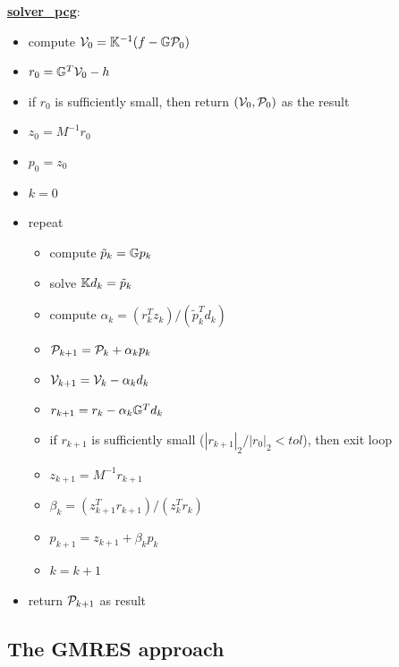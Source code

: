 \begin{mdframed}[backgroundcolor=blue!5]
\underline{\bf solver\_pcg}:
\begin{itemize}
\item compute ${\cal V}_0={\mathbb{K}}^{-1}(f-{\mathbb{G}}{\cal P}_0)$
\item $r_0 = {\mathbb{G}}^T {\cal V}_0 - h$
\item if $r_0$ is sufficiently small, then return $({\cal V}_0,{\cal P}_0)$ as the result
\item $z_0= M^{-1} r_0$ 
\item $p_0=z_0$
\item $k=0$
\item repeat
\begin{itemize}
\item compute $\tilde{p}_k = {\mathbb{G}} p_k$
\item solve ${\mathbb{K}} d_k = \tilde{p}_k$
\item compute $\alpha_k=(r_k^T z_k)/(\tilde{p}_k^T d_k)$
\item ${\cal P}_{k+1} = {\cal P}_k+\alpha_k p_k$
\item $ {\cal V}_{k+1} = {\cal V}_k - \alpha_k d_k$
\item $r_{k+1} = r_k - \alpha_k {\mathbb{G}}^T d_k $
\item if $r_{k+1}$ is sufficiently small ($|r_{k+1}|_2/|r_0|_2 <tol$), then exit loop
\item $z_{k+1}=M^{-1}r_{k+1}$
\item $\beta_k=(z_{k+1}^T r_{k+1})/(z_k^T r_k)$
\item $p_{k+1} =z_{k+1}+ \beta_k p_k$
\item $k=k+1$
\end{itemize}
\item return ${\cal P}_{k+1}$ as result
\end{itemize}
\end{mdframed}












\subsection{The GMRES approach}
